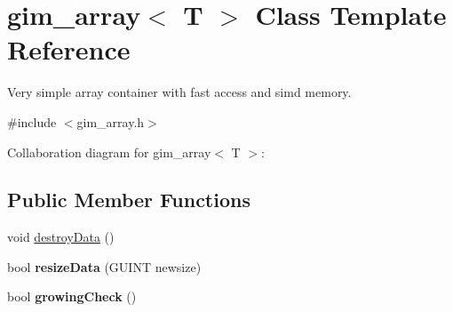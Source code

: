 \hypertarget{classgim__array}{\section{gim\+\_\+array$<$ T $>$ Class Template Reference}
\label{classgim__array}
}


Very simple array container with fast access and simd memory.  




{\ttfamily \#include $<$gim\+\_\+array.\+h$>$}



Collaboration diagram for gim\+\_\+array$<$ T $>$\+:
\subsection*{Public Member Functions}
{\bf }\par
\begin{DoxyCompactItemize}
\item 
void \hyperlink{classgim__array_aa7a9dca42674415635846cd077cb4a97}{destroy\+Data} ()
\item 
\hypertarget{classgim__array_a9d4559f0f847dd3ff602e0b828df31f2}{bool {\bfseries resize\+Data} (G\+U\+I\+N\+T newsize)}\label{classgim__array_a9d4559f0f847dd3ff602e0b828df31f2}

\item 
\hypertarget{classgim__array_aa9c596ff1639a5f6c69c16f25710f7d1}{bool {\bfseries growing\+Check} ()}\label{classgim__array_aa9c596ff1639a5f6c69c16f25710f7d1}

\end{DoxyCompactItemize}

